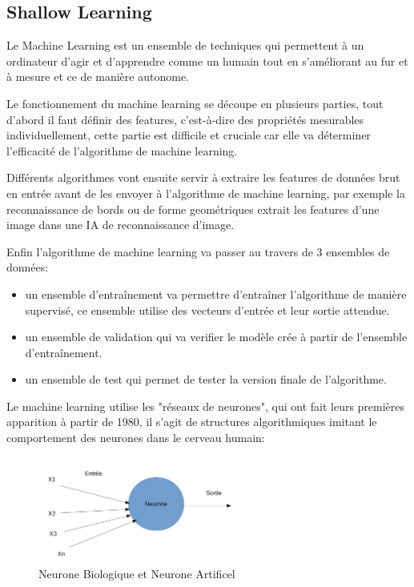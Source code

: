 \subsection{Shallow Learning}
Le Machine Learning est un ensemble de techniques qui permettent à un ordinateur
d'agir et d'apprendre comme un humain tout en s'améliorant au fur et
à mesure et ce de manière autonome. \newline

Le fonctionnement du machine learning se découpe en plusieurs parties,
tout d'abord il faut définir des features, c'est-à-dire des
propriétés mesurables individuellement, cette partie est difficile et cruciale
car elle va déterminer l'efficacité de l'algorithme de machine learning. \newline

Différents algorithmes vont ensuite servir à extraire les features de données
brut en entrée avant de les envoyer à l'algorithme de machine learning, par exemple
la reconnaissance de bords ou de forme geométriques extrait les features d'une
image dans une IA de reconnaissance d'image. \newline

Enfin l'algorithme de machine learning va passer au travers de 3 ensembles de données:
\begin{itemize}
    \item un ensemble d'entraînement va permettre d'entraîner l'algorithme de manière
     supervisé, ce ensemble utilise des vecteurs d'entrée et leur sortie attendue.
    \item un ensemble de validation qui va verifier le modèle crée à partir de l'ensemble
    d'entraînement.
    \item un ensemble de test qui permet de tester la version finale de l'algorithme.
    \newline
\end{itemize}

Le machine learning utilise les "réseaux de neurones", qui ont fait leurs premières
apparition à partir de 1980, il s'agit de structures algorithmiques imitant
le comportement des neurones dans le cerveau humain:


\begin{figure}[H]
    \centering
    \includegraphics[width=0.6\textwidth]{Images/neuroneartificiel}
    \caption{Neurone Biologique et Neurone Artificel}
	\label{fig:NN2Layers}
\end{figure}

